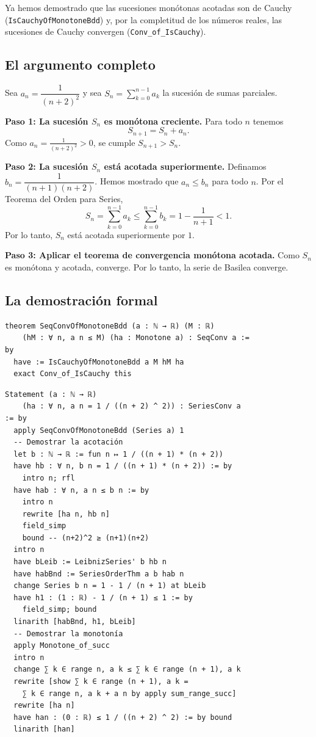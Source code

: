 Ya hemos demostrado que las sucesiones monótonas acotadas son de Cauchy (\texttt{IsCauchyOfMonotoneBdd}) y, por la completitud de los números reales, las sucesiones de Cauchy convergen (\texttt{Conv\_of\_IsCauchy}).

\subsection{El argumento completo}

Sea $a_n = \dfrac{1}{(n+2)^2}$ y sea $S_n = \sum_{k=0}^{n-1} a_k$ la sucesión de sumas parciales.

\textbf{Paso 1: La sucesión $S_n$ es monótona creciente.} Para todo $n$ tenemos
\[
  S_{n+1} = S_n + a_n .
\]
Como $a_n = \frac{1}{(n+2)^2} > 0$, se cumple $S_{n+1} > S_n$.

\textbf{Paso 2: La sucesión $S_n$ está acotada superiormente.} Definamos $b_n = \dfrac{1}{(n+1)(n+2)}$. Hemos mostrado que $a_n \le b_n$ para todo $n$. Por el Teorema del Orden para Series,
\[
  S_n = \sum_{k=0}^{n-1} a_k \le \sum_{k=0}^{n-1} b_k = 1 - \frac{1}{n+1} < 1 .
\]
Por lo tanto, $S_n$ está acotada superiormente por $1$.

\textbf{Paso 3: Aplicar el teorema de convergencia monótona acotada.} Como $S_n$ es monótona y acotada, converge. Por lo tanto, la serie de Basilea converge.

\subsection{La demostración formal}

\begin{verbatim}
theorem SeqConvOfMonotoneBdd (a : ℕ → ℝ) (M : ℝ)
    (hM : ∀ n, a n ≤ M) (ha : Monotone a) : SeqConv a :=
by
  have := IsCauchyOfMonotoneBdd a M hM ha
  exact Conv_of_IsCauchy this
\end{verbatim}

\begin{verbatim}
Statement (a : ℕ → ℝ)
    (ha : ∀ n, a n = 1 / ((n + 2) ^ 2)) : SeriesConv a
:= by
  apply SeqConvOfMonotoneBdd (Series a) 1
  -- Demostrar la acotación
  let b : ℕ → ℝ := fun n ↦ 1 / ((n + 1) * (n + 2))
  have hb : ∀ n, b n = 1 / ((n + 1) * (n + 2)) := by
    intro n; rfl
  have hab : ∀ n, a n ≤ b n := by
    intro n
    rewrite [ha n, hb n]
    field_simp
    bound -- (n+2)^2 ≥ (n+1)(n+2)
  intro n
  have bLeib := LeibnizSeries' b hb n
  have habBnd := SeriesOrderThm a b hab n
  change Series b n = 1 - 1 / (n + 1) at bLeib
  have h1 : (1 : ℝ) - 1 / (n + 1) ≤ 1 := by
    field_simp; bound
  linarith [habBnd, h1, bLeib]
  -- Demostrar la monotonía
  apply Monotone_of_succ
  intro n
  change ∑ k ∈ range n, a k ≤ ∑ k ∈ range (n + 1), a k
  rewrite [show ∑ k ∈ range (n + 1), a k =
    ∑ k ∈ range n, a k + a n by apply sum_range_succ]
  rewrite [ha n]
  have han : (0 : ℝ) ≤ 1 / ((n + 2) ^ 2) := by bound
  linarith [han]
\end{verbatim}

